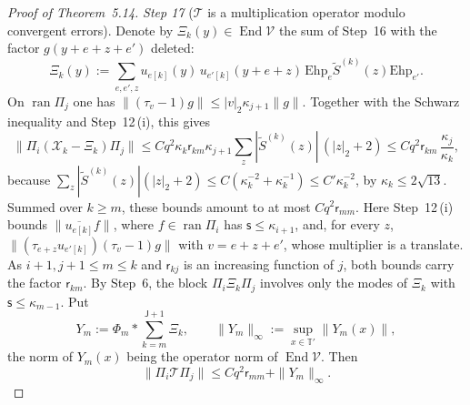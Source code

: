 \documentclass[11pt,letterpaper,reqno]{amsart}
\theoremstyle{definition}
\begin{document}
\begin{proof}[Proof of Theorem~5.14]
\emph{Step 17} ($\mathcal T$ is a multiplication operator modulo convergent errors).
Denote by $\Xi_k(y)\in\operatorname{End}\mathcal V$ the sum of Step~16 with the factor $g(y+e+z+e')$ deleted:
\begin{equation*}
\Xi_k(y):=\sum_{e,e',z}u_{e[k]}(y)\,u_{e'[k]}(y+e+z)\,\mathrm{Ehp}_e\tilde S^{(k)}(z)\mathrm{Ehp}_{e'}.
\end{equation*}
On $\operatorname{ran}\Pi_j$ one has $\|(\tau_v-1)g\|\le|v|_2\kappa_{j+1}\|g\|$.
Together with the Schwarz inequality and Step~12\,(i), this gives
\begin{equation*}
\|\Pi_i(\mathcal X_k-\Xi_k)\Pi_j\|\le Cq^2\kappa_k\mathsf r_{km}\kappa_{j+1}\sum_z|\tilde S^{(k)}(z)|\,(|z|_2+2)\le Cq^2\mathsf r_{km}\,\frac{\kappa_j}{\kappa_k},
\end{equation*}
because $\sum_z|\tilde S^{(k)}(z)|(|z|_2+2)\le C(\kappa_k^{-2}+\kappa_k^{-1})\le C'\kappa_k^{-2}$, by $\kappa_k\le2\sqrt{13}$.
Summed over $k\ge m$, these bounds amount to at most $Cq^2\mathsf r_{mm}$.
Here Step~12\,(i) bounds $\|\overline{u_{e[k]}}f\|$, where $f\in\operatorname{ran}\Pi_i$ has $\mathsf s\le\kappa_{i+1}$, and, for every $z$, $\|(\tau_{e+z}u_{e'[k]})(\tau_v-1)g\|$ with $v=e+z+e'$, whose multiplier is a translate.
As $i+1,j+1\le m\le k$ and $\mathsf r_{kj}$ is an increasing function of $j$, both bounds carry the factor $\mathsf r_{km}$.
By Step~6, the block $\Pi_i\Xi_k\Pi_j$ involves only the modes of $\Xi_k$ with $\mathsf s\le\kappa_{m-1}$.
Put
\begin{equation*}
Y_m:=\Phi_m*\sum_{k=m}^{\mathsf J+1}\Xi_k,\qquad\|Y_m\|_\infty:=\sup_{x\in\mathbb T'}\|Y_m(x)\|,
\end{equation*}
the norm of $Y_m(x)$ being the operator norm of $\operatorname{End}\mathcal V$.
Then
\begin{equation*}
\|\Pi_i\mathcal T\Pi_j\|\le Cq^2\mathsf r_{mm}+\|Y_m\|_\infty.
\end{equation*}


\end{proof}
\end{document}
